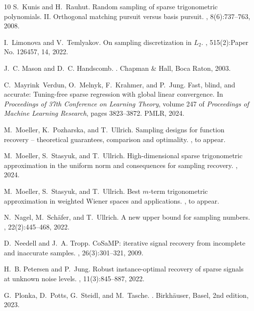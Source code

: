 \documentclass[11pt,reqno, a4paper]{article}
\numberwithin{equation}{section}
\begin{document}
\begin{thebibliography}{10}
S.~Kunis and H.~Rauhut.
\newblock Random sampling of sparse trigonometric polynomials. {II}.
  {O}rthogonal matching pursuit versus basis pursuit.
, 8(6):737--763, 2008.

I.~Limonova and V.~Temlyakov.
\newblock On sampling discretization in {$L_2$}.
, 515(2):Paper
  No. 126457, 14, 2022.

J.~C. Mason and D.~C. Handscomb.
.
\newblock Chapman \& Hall, Boca Raton, 2003.

C.~Mayrink~Verdun, O.~Melnyk, F.~Krahmer, and P.~Jung.
\newblock Fast, blind, and accurate: Tuning-free sparse regression with global
  linear convergence.
\newblock In {\em Proceedings of 37th Conference on Learning Theory}, volume
  247 of {\em Proceedings of Machine Learning Research}, pages 3823--3872.
  PMLR, 2024.

M.~Moeller, K.~Pozharska, and T.~Ullrich.
\newblock Sampling designs for function recovery -- theoretical guarantees,
  comparison and optimality.
, to appear.

M.~Moeller, S.~Stasyuk, and T.~Ullrich.
\newblock High-dimensional sparse trigonometric approximation in the uniform
  norm and consequences for sampling recovery.
, 2024.

M.~Moeller, S.~Stasyuk, and T.~Ullrich.
\newblock Best $m$-term trigonometric approximation in weighted {W}iener spaces
  and applications.
, to appear.

N.~Nagel, M.~Sch\"{a}fer, and T.~Ullrich.
\newblock A new upper bound for sampling numbers.
, 22(2):445--468, 2022.

D.~Needell and J.~A. Tropp.
\newblock Co{S}a{MP}: iterative signal recovery from incomplete and inaccurate
  samples.
, 26(3):301--321,
  2009.

H.~B. Petersen and P.~Jung.
\newblock Robust instance-optimal recovery of sparse signals at unknown noise
  levels.
, 11(3):845--887, 2022.

G.~Plonka, D.~Potts, G.~Steidl, and M.~Tasche.
.
\newblock Birkh\"auser, Basel, 2nd edition, 2023.


\end{thebibliography}
\end{document}
